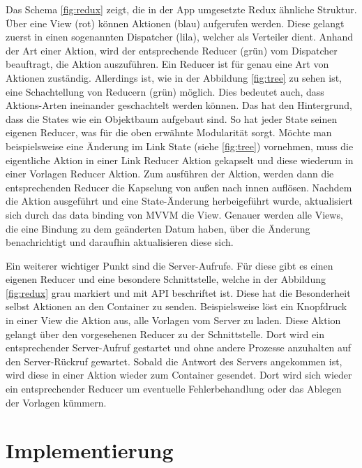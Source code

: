 \documentclass[nomenclature, oneside, 150]{HSMW-Thesis}
\begin{document}
		Das Schema \ref{fig:redux} zeigt, die in der App umgesetzte Redux ähnliche Struktur. Über eine View (rot) können Aktionen (blau) aufgerufen werden. Diese gelangt zuerst in einen sogenannten Dispatcher (lila), welcher als Verteiler dient. Anhand der Art einer Aktion, wird der entsprechende Reducer (grün) vom Dispatcher beauftragt, die Aktion auszuführen. Ein Reducer ist für genau eine Art von Aktionen zuständig. Allerdings ist, wie in der Abbildung \ref{fig:tree} zu sehen ist, eine Schachtellung von Reducern (grün) möglich. Dies bedeutet auch, dass Aktions-Arten ineinander geschachtelt werden können. Das hat den Hintergrund, dass die States wie ein Objektbaum aufgebaut sind. So hat jeder State seinen eigenen Reducer, was für die oben erwähnte Modularität sorgt. Möchte man beispielsweise eine Änderung im Link State (siehe \ref{fig:tree}) vornehmen, muss die eigentliche Aktion in einer Link Reducer Aktion gekapselt und diese wiederum in einer Vorlagen Reducer Aktion. Zum ausführen der Aktion, werden dann die entsprechenden Reducer die Kapselung von außen nach innen auflösen. Nachdem die Aktion ausgeführt und eine State-Änderung herbeigeführt wurde, aktualisiert sich durch das data binding von MVVM die View. Genauer werden alle Views, die eine Bindung zu dem geänderten Datum haben, über die Änderung benachrichtigt und daraufhin aktualisieren diese sich.

		Ein weiterer wichtiger Punkt sind die Server-Aufrufe. Für diese gibt es einen eigenen Reducer und eine besondere Schnittstelle, welche in der Abbildung \ref{fig:redux} grau markiert und mit API  beschriftet ist. Diese hat die Besonderheit selbst Aktionen an den Container zu senden. Beispielsweise löst ein Knopfdruck in einer View die Aktion aus, alle Vorlagen vom Server zu laden. Diese Aktion gelangt über den vorgesehenen Reducer zu der Schnittstelle. Dort wird ein entsprechender Server-Aufruf gestartet und ohne andere Prozesse anzuhalten auf den Server-Rückruf gewartet. Sobald die Antwort des Servers angekommen ist, wird diese in einer Aktion wieder zum Container gesendet. Dort wird sich wieder ein entsprechender Reducer um eventuelle Fehlerbehandlung oder das Ablegen der Vorlagen kümmern.
		
	\section{Implementierung}\label{sc:implementierung}
		
\end{document}
